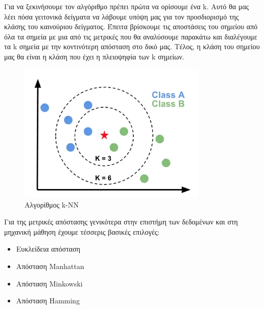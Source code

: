 Για να ξεκινήσουμε τον αλγόριθμο πρέπει πρώτα να ορίσουμε ένα \textlatin{k}. Αυτό θα μας λέει
πόσα γειτονικά δείγματα να λάβουμε υπόψη μας για τον προσδιορισμό της κλάσης του καινούριου
δείγματος. Έπειτα βρίσκουμε τις αποστάσεις του σημείου από όλα τα σημεία με μια από τις μετρικές
που θα αναλύσουμε παρακάτω και διαλέγουμε τα \textlatin{k} σημεία με την κοντινότερη απόσταση στο
δικό μας. Τέλος, η κλάση του σημείου μας θα είναι η κλάση που έχει η πλειοψηφία των \textlatin{k}
σημείων.
\begin{figure}[H]
    \centering
    \includegraphics[width=0.8\textwidth]{images/knearest.png}
    \caption{Αλγορίθμος \textlatin{k-NN}}
\end{figure}

Για της μετρικές απόστασης γενικότερα στην επιστήμη των δεδομένων και στη μηχανική μάθηση έχουμε
τέσσερις βασικές επιλογές:
\begin{itemize}
    \item Ευκλείδεια απόσταση
    \item Απόσταση \textlatin{Manhattan}
    \item Απόσταση \textlatin{Minkowski}
    \item Απόσταση \textlatin{Hamming}
\end{itemize}

